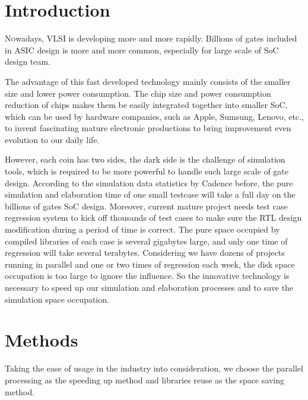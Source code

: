 \documentclass[twoside]{article}
\begin{document}
\begin{multicols}{2} %

  \section{Introduction}

  \lettrine[nindent=0em,lines=3]{N}owadays, VLSI is developing more and more rapidly. Billions of gates included in ASIC design is more and more common, especially for large scale of SoC design team.

  The advantage of this fast developed technology mainly consists of the smaller size and lower power consumption. The chip size and power consumption reduction of chips makes them be easily integrated together into smaller SoC, which can be used by hardware companies, such as Apple, Sumsung, Lenovo, etc., to invent fascinating mature electronic productions to bring improvement even evolution to our daily life.
  
  However, each coin has two sides, the dark side is the challenge of simulation tools, which is required to be more powerful to handle such large scale of gate design. According to the simulation data statistics by Cadence before, the pure simulation and elaboration time of one small testcase will take a full day on the billions of gates SoC design. Moreover, current mature project needs test case regression system to kick off thousands of test cases to make sure the RTL design modification during a period of time is correct. The pure space occupied by compiled libraries of each case is several gigabytes large, and only one time of regression will take several terabytes. Considering we have dozens of projects running in parallel and one or two times of regression each week, the disk space occupation is too large to ignore the influence. So the innovative technology is necessary to speed up our simulation and elaboration processes and to save the simulation space occupation.


  \section{Methods}

  Taking the ease of usage in the industry into consideration, we choose the parallel processing as the speeding up method and libraries reuse as the space saving method.


\end{multicols}
\end{document}
